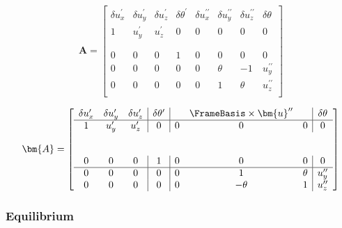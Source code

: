 $$
\bm{A} = 
\left[
\begin{array}{ccc|c|ccc|c}
\delta u_x^{\prime} &             \delta u_y^{\prime} &            \delta u_z^{\prime} & \delta \theta^{\prime} & \delta u_x^{\prime\prime} & \delta u_y^{\prime\prime} & \delta u_z^{\prime\prime} & \delta \theta \\ 
\hline
        1 &                    u_y^{\prime} &                   u_z^{\prime} & 0 &             0 &                        0 &                         0 &                   0 \\
\\
\\
        0 & 0 & 0 & 1 &             0 & 0 & 0 &                   0 \\ \hline
        0 &                               0 &                              0 & 0 &             0 &                   \theta &       -1 &  u_y^{\prime\prime} \\
        0 &                               0 &                              0 & 0 &             0 &        1  &                    \theta &  u_z^{\prime\prime} \\
\end{array}
\right]
$$

$$
\bm{A} = 
\left[
\begin{array}{ccc|c|ccc|c}
\delta u_x^{\prime} &             \delta u_y^{\prime} &            \delta u_z^{\prime} & \delta \theta^{\prime} & &\FrameBasis \times\bm{u}^{\prime\prime} & & \delta \theta \\ 
\hline
        1 &                    u_y^{\prime} &                   u_z^{\prime} & 0 &             0 &                        0 &                         0 &                   0 \\
\\
\\
        0 & 0 & 0 & 1 &             0 & 0 & 0 &                   0 \\ \hline
        0 &                               0 &                              0 & 0 &             0 &                   1 &       \theta &  u_y^{\prime\prime} \\
        0 &                               0 &                              0 & 0 &             0 &        -\theta  &                    1 &  u_z^{\prime\prime} \\
\end{array}
\right]
$$

\subsubsection{Equilibrium}


